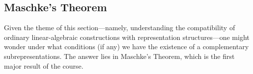 \begin{comment}
\begin{proposition}\label{Ch1:Prop:Comp_Red_iff_Compl_Subreps}
    A finite-dimensional representation of a finite group is completely reducible if and only if each of its subrepresentations admits a complementary subrepresentation.
\end{proposition}
\begin{proof}
    \letfgfv.
    \begin{description}
        \item[$\parenth{\implies}$] Assume $\Vp$ is completely reducible, with decomposition $V = \bigoplus_{i \in \I} W_i$ into irreducible subrepresentations. Let $U \leq V$ be $G$-invariant. Define $U_i := U \cap W_i$ for all $i \in \I$. Each $U_i$ is $G$-invariant, making it a subrepresentation of $W_i$. As the $W_i$s are irreducible, each $U_i$ is either $\set{0}$ or $W_i$. Now, let $\J := \set{i \in \I : U_i = W_i}$. 
        
        \item[$\parenth{\impliedby}$] Assume every subrepresentation of $\Vp$ admits a complementary subrepresentation. We know that $\Vp$ is either irreducible, in which case we'd be done, or reducible, in which case there exists a proper, nonzero, $G$-invariant subspace $W \leq V$. We know that $W$ admits a complementary subrepresentation $U \leq V$, which must also be proper and nonzero. We can argue by induction on the dimension to completely reduce both $W$ and $U$ (ie, express them as direct sums of irreducibles). We can then conclude that $\Vp$ is completely reducible.
    \end{description}
\end{proof}
\end{comment}

\subsection{Maschke's Theorem}

Given the theme of this section---namely, understanding the compatibility of ordinary linear-algebraic constructions with representation structures---one might wonder under what conditions (if any) we have the existence of a complementary subrepresentations. The answer lies in Maschke's Theorem, which is the first major result of the course.

